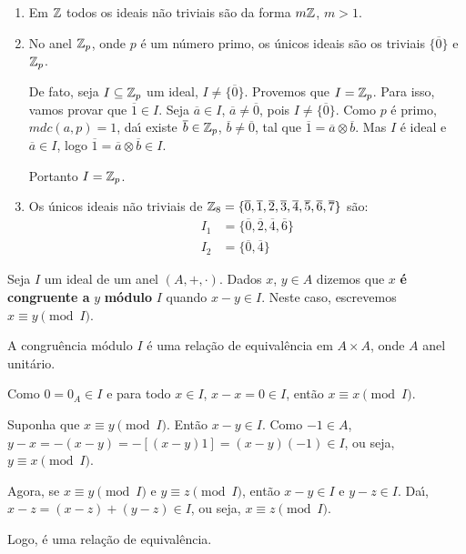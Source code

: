 \begin{exemplos}
	\begin{enumerate}[label={\arabic*})]
		\item Em $\mathbb{Z}$ todos os ideais n{\~a}o triviais s{\~a}o da forma $m\mathbb{Z}$, $m > 1$.
		\item No anel $\mathbb{Z}_p$, onde $p$ {\'e} um n{\'u}mero primo, os {\'u}nicos ideais  s{\~a}o os triviais $\{\overline{0}\}$ e $\mathbb{Z}_p$.
		
		De fato, seja $I \subseteq \mathbb{Z}_p$ um ideal, $I \neq \{\overline{0}\}$. Provemos que $I = \mathbb{Z}_p$. Para isso,
		vamos provar que $\overline{1} \in I$. Seja $\overline{a} \in I$, $\overline{a} \neq \overline{0}$, pois $I \neq \{\overline{0}\}$. Como $p$ {\'e} primo, $mdc(a,p) = 1$, da{\'\i} existe $\overline{b} \in \mathbb{Z}_p$, $\overline{b} \neq \overline{0}$, tal que $\overline{1} = \overline{a} \otimes \overline{b}$. Mas $I$ {\'e} ideal e $\overline{a} \in I$, logo $\overline{1} = \overline{a} \otimes \overline{b} \in I$.

		Portanto $I = \mathbb{Z}_p$.

		\item Os {\'u}nicos ideais n{\~a}o triviais de $\mathbb{Z}_8 = \{\overline{0}, \overline{1}, \overline{2}, \overline{3}, \overline{4}, \overline{5}, \overline{6}, \overline{7}\}$ s{\~a}o:
		\begin{align*}
			I_1 &= \{\overline{0}, \overline{2}, \overline{4}, \overline{6}\}\\
			I_2 &=\{\overline{0}, \overline{4}\}
		\end{align*}
	\end{enumerate}	
\end{exemplos}


\begin{definicao}
	Seja $I$ um ideal de um anel $(A, +, \cdot)$. Dados $x$, $y \in A$ dizemos que $x$ \textbf{\'e congruente a} $y$ \textbf{m\'odulo} $I$ quando $x-y \in I$. Neste caso, escrevemos $x\equiv y \pmod I$.
\end{definicao}

\begin{proposicao}
	A congru{\^e}ncia m{\'o}dulo $I$ {\'e} uma rela{\c c}{\~a}o de equival{\^e}ncia em $A \times A$, onde $A$ anel unit{\'a}rio.
\end{proposicao}
\begin{prova}
	Como $0 = 0_{A} \in I$ e para todo $x \in I$, $x - x = 0 \in I$, ent{\~a}o $x \equiv x \pmod I$.

	Suponha que $x\equiv y \pmod I$. Ent{\~a}o $x - y \in I$. Como $-1 \in A$, $y - x = -(x - y) = -[(x - y)1] = (x - y)(-1) \in I$, ou seja, $y\equiv x \pmod I$.

	Agora, se $x\equiv y \pmod I$ e $y\equiv z \pmod I$, ent{\~a}o $x - y \in I$ e $y - z \in I$. Da{\'\i}, $x - z = (x - z) + (y - z)\in I$, ou seja, $x\equiv z \pmod I$.

	Logo, {\'e} uma rela{\c c}{\~a}o de equival{\^e}ncia.
\end{prova}


